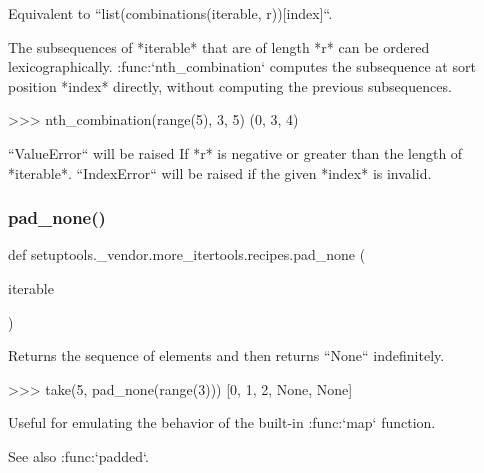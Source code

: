 \begin{DoxyVerb}Equivalent to ``list(combinations(iterable, r))[index]``.

The subsequences of *iterable* that are of length *r* can be ordered
lexicographically. :func:`nth_combination` computes the subsequence at
sort position *index* directly, without computing the previous
subsequences.

    >>> nth_combination(range(5), 3, 5)
    (0, 3, 4)

``ValueError`` will be raised If *r* is negative or greater than the length
of *iterable*.
``IndexError`` will be raised if the given *index* is invalid.
\end{DoxyVerb}
 \mbox{\label{namespacesetuptools_1_1__vendor_1_1more__itertools_1_1recipes_a1b44a1acded637f59c3422ea8b6c7fd9}} 
\subsubsection{\texorpdfstring{pad\+\_\+none()}{pad\_none()}}
{\footnotesize\ttfamily def setuptools.\+\_\+vendor.\+more\+\_\+itertools.\+recipes.\+pad\+\_\+none (\begin{DoxyParamCaption}\item[{}]{iterable }\end{DoxyParamCaption})}

\begin{DoxyVerb}Returns the sequence of elements and then returns ``None`` indefinitely.

    >>> take(5, pad_none(range(3)))
    [0, 1, 2, None, None]

Useful for emulating the behavior of the built-in :func:`map` function.

See also :func:`padded`.\end{DoxyVerb}
 \mbox{\label{namespacesetuptools_1_1__vendor_1_1more__itertools_1_1recipes_abf4c735370446f73988dabd8407db8d8}} 
